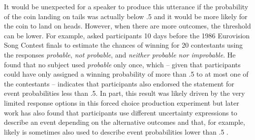 \noindent It would be unexpected for a speaker to produce this utterance if the probability of the coin landing on tails was actually
below .5 and it would be more likely for the coin to land on heads. However, when there are more outcomes, the threshold can be lower.
For example, \textcite{Teigen1988} asked participants 10 days before the 1986 Eurovision Song Contest finals to estimate the chances of winning for 
20 contestants using the responses \textit{probable}, \textit{not probable}, and \textit{neither probable nor improbable}.  He found that no subject
used \textit{probable} only once, which -- given that participants could have only assigned a winning probability of more than .5 to at most one of the contestants --
indicates that participants also endorsed the statement for event probabilities less than .5. In part, this result was likely driven by the very limited response options
in this forced choice production experiment but later work has also found that participants use different uncertainty expressions to describe an event depending on the
alternative outcomes and that, for example, likely is sometimes also used to describe event probabilities lower than .5 .

